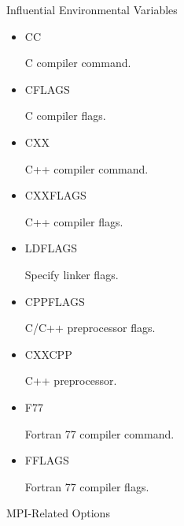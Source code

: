\documentclass[12pt,relax]{TrilinosDevGuide}
\begin{document}
 Influential Environmental Variables

\begin{itemize}
\item CC 

C compiler command.

\item CFLAGS 

C compiler flags.

\item CXX 

C++ compiler command.

\item CXXFLAGS 

C++ compiler flags.

\item LDFLAGS 

Specify linker flags.

\item CPPFLAGS 

C/C++ preprocessor flags.

\item CXXCPP 

C++ preprocessor.

\item F77 

Fortran 77 compiler command.

\item FFLAGS 

Fortran 77 compiler flags.
\end{itemize}

MPI-Related Options
\end{document}
